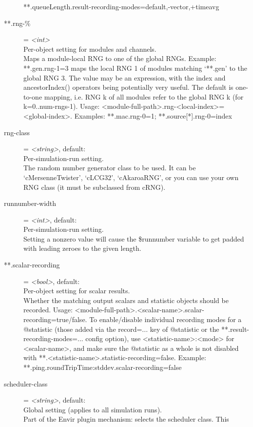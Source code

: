 \begin{description}
    **.queueLength.result-recording-modes=default,-vector,+timeavg
\item[**.rng-\%] = \textit{<int>}\\
    Per-object setting for modules and channels.\\
    Maps a module-local RNG to one of the global RNGs. Example: **.gen.rng-1=3
    maps the local RNG 1 of modules matching `**.gen' to the global RNG 3. The
    value may be an expression, with the index and ancestorIndex() operators
    being potentially very useful. The default is one-to-one mapping, i.e. RNG
    k of all modules refer to the global RNG k (for k=0..num-rngs-1). Usage:
    <module-full-path>.rng-<local-index>=<global-index>. Examples:
    **.mac.rng-0=1; **.source[*].rng-0=index
\item[rng-class] = \textit{<string>}, default: \\
    Per-simulation-run setting.\\
    The random number generator class to be used. It can be `cMersenneTwister',
    `cLCG32', `cAkaroaRNG', or you can use your own RNG class (it must be
    subclassed from cRNG).
\item[runnumber-width] = \textit{<int>}, default: \\
    Per-simulation-run setting.\\
    Setting a nonzero value will cause the \$runnumber variable to get padded
    with leading zeroes to the given length.
\item[**.scalar-recording] = \textit{<bool>}, default: \\
    Per-object setting for scalar results.\\
    Whether the matching output scalars and statistic objects should be
    recorded. Usage:
    <module-full-path>.<scalar-name>.scalar-recording=true/false. To
    enable/disable individual recording modes for a @statistic (those added via
    the record=... key of @statistic or the **.result-recording-modes=...
    config option), use <statistic-name>:<mode> for <scalar-name>, and make
    sure the @statistic as a whole is not disabled with
    **.<statistic-name>.statistic-recording=false. Example:
    **.ping.roundTripTime:stddev.scalar-recording=false
\item[scheduler-class] = \textit{<string>}, default: \\
    Global setting (applies to all simulation runs).\\
    Part of the Envir plugin mechanism: selects the scheduler class. This

\end{description}
